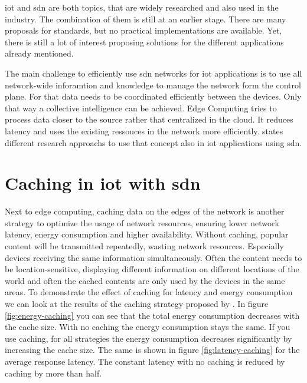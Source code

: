 \documentclass[conference]{IEEEtran}
\begin{document}
	\ac{iot} and \ac{sdn} are both topics, that are widely researched and also used in the industry. The combination of them is still at an earlier stage. There are many proposals for standards, but no practical implementations are available. Yet, there is still a lot of interest proposing solutions for the different applications already mentioned. \cite{Manguri2022-vp} 

	The main challenge to efficiently use \ac{sdn} networks for \ac{iot} applications is to use all network-wide inforamtion and knowledge to manage the network form the control plane. For that data needs to be coordinated efficiently between the devices. Only that way a collective intelligence can be achieved. Edge Computing tries to process data closer to the source rather that centralized in the cloud. It reduces latency and uses the existing ressouces in the network more efficiently. \cite{edge-computing} \citeauthor{Li2020-lx} states different research approachs to use that concept also in \ac{iot} applications using \ac{sdn}. 

	






	\cite{8777339} \cite{Sahrish2017}

	\section{Caching in \ac{iot} with \ac{sdn}}
	\label{section:caching}

	Next to edge computing, caching data on the edges of the network is another strategy to optimize the usage of network resources, ensuring lower network latency, energy consumption and higher availability. \cite{caching-1} \cite{caching-2} \cite{caching-4} Without caching, popular content will be transmitted repeatedly, wasting network resources. Especially devices receiving the same information simultaneously. Often the content needs to be location-sensitive, displaying different information on different locations of the world and often the cached contents are only used by the devices in the same areas. To demonstrate the effect of caching  for latency and energy consumption we can look at the results of the caching strategy proposed by \cite{caching-1}. In figure \ref{fig:energy-caching} you can see that the total energy consumption decreases with the cache size. With no caching the energy consumption stays the same. If you use caching, for all strategies the energy consumption decreases significantly by increasing the cache size. The same is shown in figure \ref{fig:latency-caching} for the average response latency. The constant latency with no caching is reduced by caching by more than half.
\end{document}
